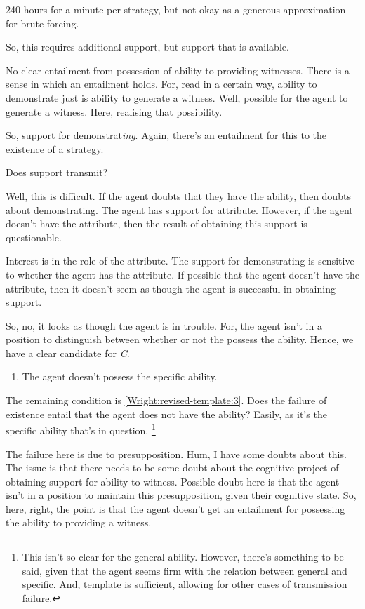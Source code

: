 \documentclass[10pt]{article}
\begin{document}
\begin{note}
{    240 hours for a minute per strategy, but not okay as a generous approximation for brute forcing.
  }

  So, this requires additional support, but support that is available.

  No clear entailment from possession of ability to providing witnesses.
  {
    \color{red}
    There is a sense in which an entailment holds.
    For, read in a certain way, ability to demonstrate just is ability to generate a witness.
    Well, possible for the agent to generate a witness.
    Here, realising that possibility.
  }

  So, support for demonstrat\emph{ing}.
  Again, there's an entailment for this to the existence of a strategy.

  Does support transmit?

  Well, this is difficult.
  If the agent doubts that they have the ability, then doubts about demonstrating.
  The agent has support for attribute.
  However, if the agent doesn't have the attribute, then the result of obtaining this support is questionable.

  Interest is in the role of the attribute.
  The support for demonstrating is sensitive to whether the agent has the attribute.
  If possible that the agent doesn't have the attribute, then it doesn't seem as though the agent is successful in obtaining support.
  

  


  
  
  So, no, it looks as though the agent is in trouble.
  For, the agent isn't in a position to distinguish between whether or not the possess the ability.
  Hence, we have a clear candidate for \emph{C}.

  \begin{enumerate}[label=(C\arabic*)]
  \item The agent doesn't possess the specific ability.
  \end{enumerate}

  The remaining condition is \ref{Wright:revised-template:3}.
  Does the failure of existence entail that the agent does not have the ability?
  Easily, as it's the specific ability that's in question.\nolinebreak
  \footnote{
    This isn't so clear for the general ability.
    However, there's something to be said, given that the agent seems firm with the relation between general and specific.
    And, template is sufficient, allowing for other cases of transmission failure.
  }

  The failure here is due to presupposition.
  Hum, I have some doubts about this.
  The issue is that there needs to be some doubt about the cognitive project of obtaining support for ability to witness.
  Possible doubt here is that the agent isn't in a position to maintain this presupposition, given their cognitive state.
  So, here, right, the point is that the agent doesn't get an entailment for possessing the ability to providing a witness.
  
\end{note}
\end{document}
